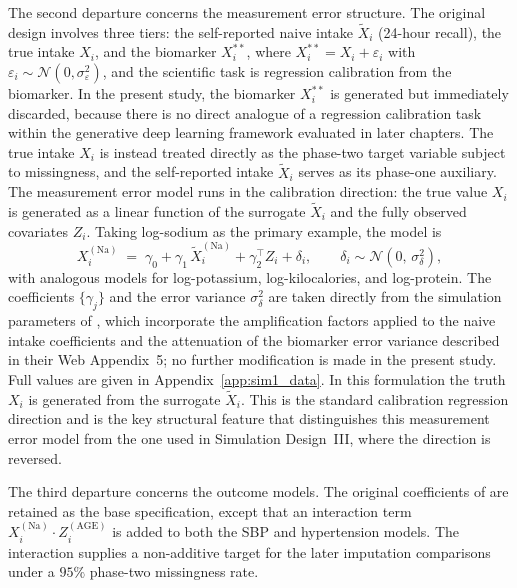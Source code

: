 The second departure concerns the measurement error structure. The original design involves three tiers: the self-reported naive intake $\tilde{X}_i$ (24-hour recall), the true intake $X_i$, and the biomarker $X^{**}_i$, where $X^{**}_i = X_i + \varepsilon_i$ with $\varepsilon_i \sim \mathcal{N}(0, \sigma^2_\varepsilon)$, and the scientific task is regression calibration from the biomarker. In the present study, the biomarker $X^{**}_i$ is generated but immediately discarded, because there is no direct analogue of a regression calibration task within the generative deep learning framework evaluated in later chapters. The true intake $X_i$ is instead treated directly as the phase-two target variable subject to missingness, and the self-reported intake $\tilde{X}_i$ serves as its phase-one auxiliary. The measurement error model runs in the calibration direction: the true value $X_i$ is generated as a linear function of the surrogate $\tilde{X}_i$ and the fully observed covariates $Z_i$. Taking log-sodium as the primary example, the model is
\begin{equation}
    X_i^{(\mathrm{Na})} \;=\; \gamma_0
    + \gamma_1\, \tilde{X}_i^{(\mathrm{Na})}
    + \gamma_2^{\top} Z_i
    + \delta_i,
    \qquad
    \delta_i \sim \mathcal{N}(0,\, \sigma^2_{\delta}),
    \label{eq:glm_me}
\end{equation}
with analogous models for log-potassium, log-kilocalories, and log-protein. The coefficients $\{\gamma_j\}$ and the error variance $\sigma^2_\delta$ are taken directly from the simulation parameters of \citet{baldoni2021use}, which incorporate the amplification factors applied to the naive intake coefficients and the attenuation of the biomarker error variance described in their Web Appendix~5; no further modification is made in the present study. Full values are given in Appendix~\ref{app:sim1_data}. In this formulation the truth $X_i$ is generated from the surrogate $\tilde{X}_i$. This is the standard calibration regression direction and is the key structural feature that distinguishes this measurement error model from the one used in Simulation Design~III, where the direction is reversed.

The third departure concerns the outcome models. The original coefficients of \citet{baldoni2021use} are retained as the base specification, except that an interaction term $X_i^{(\mathrm{Na})} \cdot Z_i^{(\mathrm{AGE})}$ is added to both the SBP and hypertension models. The interaction supplies a non-additive target for the later imputation comparisons under a $95\%$ phase-two missingness rate.

